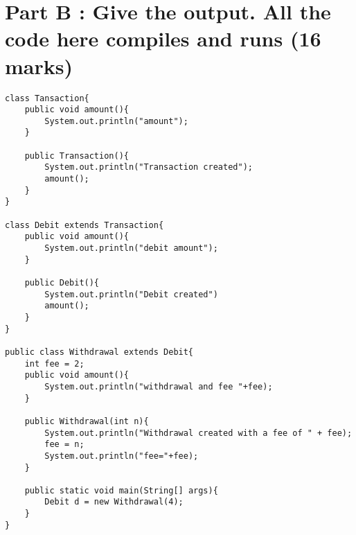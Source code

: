 \documentclass{article}
\begin{document}
\section{Part B : Give the output. All the code here compiles and runs (16 marks)}
\begin{lstlisting}
class Tansaction{
	public void amount(){
		System.out.println("amount");
	}
	
	public Transaction(){
		System.out.println("Transaction created");
		amount();
	}
}

class Debit extends Transaction{
	public void amount(){
		System.out.println("debit amount");
	}
	
	public Debit(){
		System.out.println("Debit created")
		amount();
	}
}

public class Withdrawal extends Debit{
	int fee = 2;
	public void amount(){
		System.out.println("withdrawal and fee "+fee);
	}
	
	public Withdrawal(int n){
		System.out.println("Withdrawal created with a fee of " + fee);
		fee = n;
		System.out.println("fee="+fee);
	}
	
	public static void main(String[] args){
		Debit d = new Withdrawal(4);
	}
}
\end{lstlisting}
\end{document}

